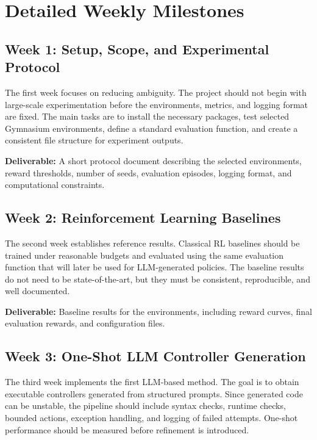 \documentclass[11pt,a4paper]{article}
\newcommand{\deliverable}[1]{\textbf{Deliverable:} #1}
\begin{document}
\section{Detailed Weekly Milestones}

\subsection*{Week 1: Setup, Scope, and Experimental Protocol}

The first week focuses on reducing ambiguity. The project should not begin with large-scale experimentation before the environments, metrics, and logging format are fixed. The main tasks are to install the necessary packages, test selected Gymnasium environments, define a standard evaluation function, and create a consistent file structure for experiment outputs.

\deliverable{A short protocol document describing the selected environments, reward thresholds, number of seeds, evaluation episodes, logging format, and computational constraints.}

\subsection*{Week 2: Reinforcement Learning Baselines}

The second week establishes reference results. Classical RL baselines should be trained under reasonable budgets and evaluated using the same evaluation function that will later be used for LLM-generated policies. The baseline results do not need to be state-of-the-art, but they must be consistent, reproducible, and well documented.

\deliverable{Baseline results for the environments, including reward curves, final evaluation rewards, and configuration files.}

\subsection*{Week 3: One-Shot LLM Controller Generation}

The third week implements the first LLM-based method. The goal is to obtain executable controllers generated from structured prompts. Since generated code can be unstable, the pipeline should include syntax checks, runtime checks, bounded actions, exception handling, and logging of failed attempts. One-shot performance should be measured before refinement is introduced.
\end{document}
